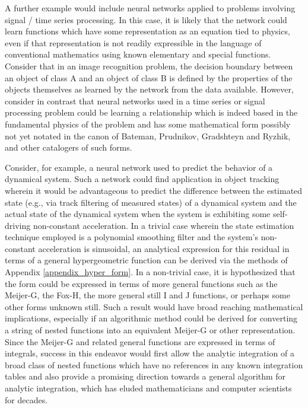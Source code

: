 A further example would include neural networks applied to problems involving signal / time series processing.  In this case, it is likely that the network could learn functions which have some representation as an equation tied to physics, even if that representation is not readily expressible in the language of conventional mathematics using known elementary and special functions.  Consider that in an image recognition problem, the decision boundary between an object of class A and an object of class B is defined by the properties of the objects themselves as learned by the network from the data available.  However, consider in contrast that neural networks used in a time series or signal processing problem could be learning a relationship which is indeed based in the fundamental physics of the problem and has some mathematical form possibly not yet notated in the canon of Bateman, Prudnikov, Gradshteyn and Ryzhik, and other catalogers of such forms.

Consider, for example, a neural network used to predict the behavior of a dynamical system.
Such a network could find application in object tracking wherein it would be advantageous to predict the difference between the estimated state (e.g., via track filtering of measured states) of a dynamical system and the actual state of the dynamical system when the system is exhibiting some self-driving non-constant acceleration.  In a trivial case wherein the state estimation technique employed is a polynomial smoothing filter and the system's non-constant acceleration is sinusoidal, an analytical expression for this residual in terms of a general hypergeometric function can be derived via the methods of Appendix \ref{appendix_hyper_form}.  In a non-trivial case, it is hypothesized that the form could be expressed in terms of more general functions such as the Meijer-G, the Fox-H, the more general still I and J functions, or perhaps some other forms unknown still.  Such a result would have broad reaching mathematical implications, especially if an algorithmic method could be derived for converting a string of nested functions into an equivalent Meijer-G or other representation.   Since the Meijer-G and related general functions are expressed in terms of integrals, success in this endeavor would first allow the analytic integration of a broad class of nested functions which have no references in any known integration tables and also provide a promising direction towards a general algorithm for analytic integration, which has eluded mathematicians and computer scientists for decades.

